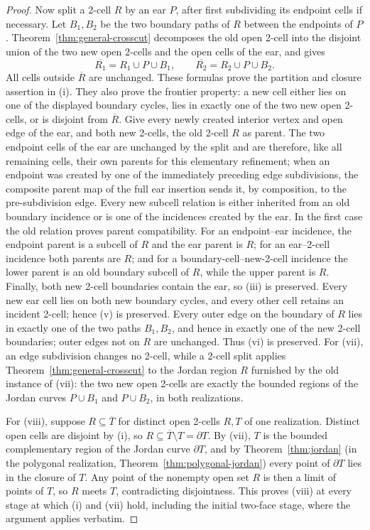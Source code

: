 \documentclass[11pt]{article}
\theoremstyle{mainplain}
\theoremstyle{mainroman}
\theoremstyle{definition}
\numberwithin{equation}{section}
\begin{document}
\begin{proof}
Now split a 2-cell \(R\) by an ear \(P\), after first subdividing its endpoint cells if necessary. Let \(B_1,B_2\) be the two boundary paths of \(R\) between the endpoints of \(P\). Theorem~\ref{thm:general-crosscut} decomposes the old open 2-cell into the disjoint union of the two new open 2-cells and the open cells of the ear, and gives
\[
 \overline{R_1}=R_1\cup P\cup B_1,
 \qquad
 \overline{R_2}=R_2\cup P\cup B_2.
\]
All cells outside \(\overline R\) are unchanged. These formulas prove the partition and closure assertion in (i). They also prove the frontier property: a new cell either lies on one of the displayed boundary cycles, lies in exactly one of the two new open 2-cells, or is disjoint from \(\overline R\). Give every newly created interior vertex and open edge of the ear, and both new 2-cells, the old 2-cell \(R\) as parent. The two endpoint cells of the ear are unchanged by the split and are therefore, like all remaining cells, their own parents for this elementary refinement; when an endpoint was created by one of the immediately preceding edge subdivisions, the composite parent map of the full ear insertion sends it, by composition, to the pre-subdivision edge. Every new subcell relation is either inherited from an old boundary incidence or is one of the incidences created by the ear. In the first case the old relation proves parent compatibility. For an endpoint--ear incidence, the endpoint parent is a subcell of \(R\) and the ear parent is \(R\); for an ear--2-cell incidence both parents are \(R\); and for a boundary-cell--new-2-cell incidence the lower parent is an old boundary subcell of \(R\), while the upper parent is \(R\). Finally, both new 2-cell boundaries contain the ear, so (iii) is preserved. Every new ear cell lies on both new boundary cycles, and every other cell retains an incident 2-cell; hence (v) is preserved. Every outer edge on the boundary of $R$ lies in exactly one of the two paths $B_1,B_2$, and hence in exactly one of the new 2-cell boundaries; outer edges not on $R$ are unchanged. Thus (vi) is preserved. For (vii), an edge subdivision changes no 2-cell, while a 2-cell split applies Theorem~\ref{thm:general-crosscut} to the Jordan region $R$ furnished by the old instance of (vii): the two new open 2-cells are exactly the bounded regions of the Jordan curves $P\cup B_1$ and $P\cup B_2$, in both realizations.

For (viii), suppose \(R\subseteq\overline T\) for distinct open
2-cells \(R,T\) of one realization. Distinct open cells are disjoint
by (i), so \(R\subseteq\overline T\setminus T=\partial T\). By (vii),
\(T\) is the bounded complementary region of the Jordan curve
\(\partial T\), and by Theorem~\ref{thm:jordan} (in the polygonal
realization, Theorem~\ref{thm:polygonal-jordan}) every point of
\(\partial T\) lies in the closure of \(T\). Any point of the
nonempty open set \(R\) is then a limit of points of \(T\), so \(R\)
meets \(T\), contradicting disjointness. This proves (viii) at every stage at which (i) and (vii) hold,
including the initial two-face stage, where the argument applies
verbatim.


\end{proof}
\end{document}
